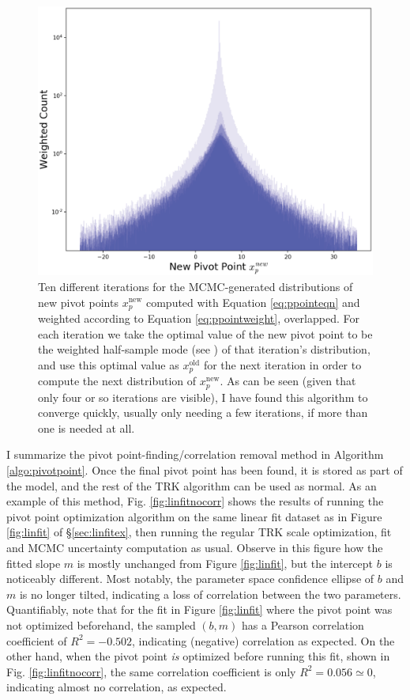 \begin{figure}
    \centering
    \includegraphics[width=0.8\linewidth]{figures/pivotpointdist.eps}
    \caption{Ten different iterations for the MCMC-generated distributions of new pivot points $x_p^\text{new}$ computed with Equation \eqref{eq:ppointeqn} and weighted according to Equation \eqref{eq:ppointweight}, overlapped. For each iteration we take the optimal value of the new pivot point to be the weighted half-sample mode (see \textcite{bickel2005fast}) of that iteration's distribution, and use this optimal value as $x_p^\text{old}$ for the next iteration in order to compute the next distribution of $x_p^\text{new}$. As can be seen (given that only four or so iterations are visible), I have found this algorithm to converge quickly, usually only needing a few iterations, if more than one is needed at all.}
    \label{fig:ppointiters}
\end{figure}

I summarize the pivot point-finding/correlation removal method in Algorithm \ref{algo:pivotpoint}. Once the final pivot point has been found, it is stored as part of the model, and the rest of the TRK algorithm can be used as normal. As an example of this method, Fig. \ref{fig:linfitnocorr} shows the results of running the pivot point optimization algorithm on the same linear fit dataset as in Figure \ref{fig:linfit} of \S\ref{sec:linfitex}, then running the regular TRK scale optimization, fit and MCMC uncertainty computation as usual. Observe in this figure how the fitted slope $m$ is mostly unchanged from Figure \ref{fig:linfit}, but the intercept $b$ is noticeably different. Most notably, the parameter space confidence ellipse of $b$ and $m$ is no longer tilted, indicating a loss of correlation between the two parameters. Quantifiably, note that for the fit in Figure \ref{fig:linfit} where the pivot point was not optimized beforehand, the sampled $(b,m)$ has a Pearson correlation coefficient of $R^2 = -0.502$, indicating (negative) correlation as expected. On the other hand, when the pivot point \textit{is} optimized before running this fit, shown in Fig. \ref{fig:linfitnocorr}, the same correlation coefficient is only $R^2=0.056\simeq 0$, indicating almost no correlation, as expected.

